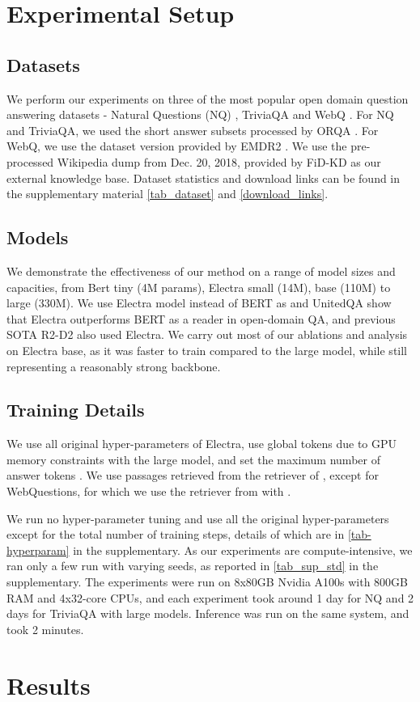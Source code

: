 \documentclass[11pt]{article}
\begin{document}
\section{Experimental Setup}

\subsection{Datasets}

We perform our experiments on three of the most popular open domain question answering datasets - Natural Questions (NQ) \cite{nq}, TriviaQA \cite{joshi2017triviaqa} and WebQ \cite{webqa}. For NQ and TriviaQA, we used the short answer subsets processed by ORQA \cite{orqa}. For WebQ, we use the dataset version provided by EMDR2 \citet{emdr2}. We use the pre-processed Wikipedia dump from Dec. 20, 2018, provided by FiD-KD \citet{fidkd} as our external knowledge base. Dataset statistics and download links can be found in the supplementary material \cref{tab_dataset} and \cref{download_links}.

\subsection{Models}

We demonstrate the effectiveness of our method on a range of model sizes and capacities, from Bert \cite{devlin-etal-2019-bert} tiny (4M params), Electra \cite{clark2020electra} small (14M), base (110M) to large (330M). We use Electra model instead of BERT as \citet{clark2020electra} and UnitedQA \cite{udtqa} show that Electra outperforms BERT as a reader in open-domain QA, and previous SOTA R2-D2 \cite{r2d2} also used Electra. We carry out most of our ablations and analysis on Electra base, as it was faster to train compared to the large model, while still representing a reasonably strong backbone.



\subsection{Training Details}

We use all original hyper-parameters of Electra, use  global tokens due to GPU memory constraints with the large model, and set the maximum number of answer tokens . We use  passages retrieved from the retriever of \citet{fidkd}, except for WebQuestions, for which we use the retriever from \citet{emdr2} with . 

We run no hyper-parameter tuning and use all the original hyper-parameters except for the total number of training steps, details of which are in \cref{tab-hyperparam} in the supplementary. As our experiments are compute-intensive, we ran only a few run with varying seeds, as reported in \cref{tab_sup_std} in the supplementary. The experiments were run on 8x80GB Nvidia A100s with 800GB RAM and 4x32-core CPUs, and each experiment took around 1 day for NQ and 2 days for TriviaQA with large models. Inference was run on the same system, and took 2 minutes. \section{Results}
\end{document}
